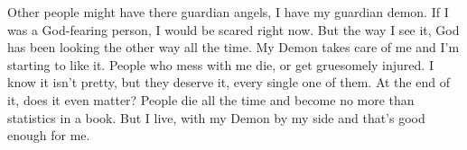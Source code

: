 \documentclass[11pt,letterpaper]{article}
\begin{document}
Other people might have there guardian angels, I have my guardian demon. If I was a God-fearing person, I would be scared right now. But the way I see it, God has been looking the other way all the time. My Demon takes care of me and I'm starting to like it. People who mess with me die, or get gruesomely injured. I know it isn't pretty, but they deserve it, every single one of them. At the end of it, does it even matter? People die all the time and become no more than statistics in a book. But I live, with my Demon by my side and that's good enough for me.
\end{document}
